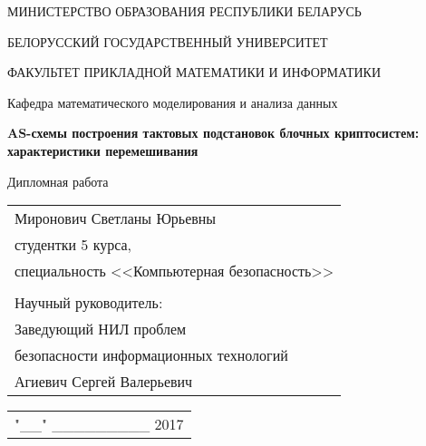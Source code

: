 \documentclass[a4paper,14pt]{extarticle}
\begin{document}
\thispagestyle{empty}
\vspace*{2cm}

\begin{center}
\MakeTextUppercase{Министерство образования Республики Беларусь}\par
\MakeTextUppercase{Белорусский Государственный Университет}\par 
\MakeTextUppercase{Факультет Прикладной Математики и Информатики}\par
Кафедра математического моделирования и анализа данных
\par
\end{center}

\vspace*{5cm}

\begin{center}
{\bf \large AS-схемы построения тактовых подстановок блочных криптосистем: характеристики перемешивания}
\end{center}

\vspace*{2cm}

\begin{center}
Дипломная работа
\end{center}

\vspace{2cm}

\begin{flushright}
\begin{tabular}{l}
Миронович Светланы Юрьевны\\
студентки 5 курса,\\
специальность <<Компьютерная безопасность>>\\
\\
Научный руководитель:\\
Заведующий НИЛ проблем 
\\безопасности информационных технологий\\
Агиевич Сергей Валерьевич
\end{tabular}
\end{flushright}

\begin{flushleft}
\begin{tabular}{r}
"\_\_" \_\_\_\_\_\_\_\_\_ 2017
\end{tabular}
\end{flushleft}

\par\vspace*{\fill}
\end{document}

